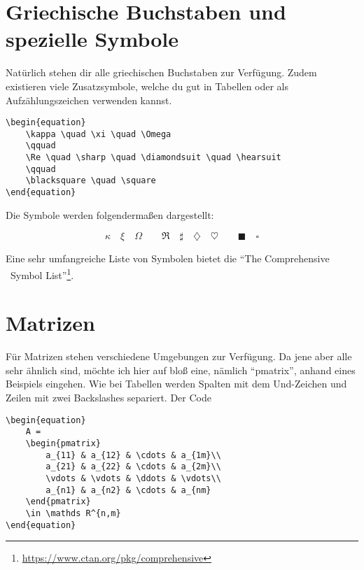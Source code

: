 \section{Griechische Buchstaben und spezielle Symbole}

Natürlich stehen dir alle griechischen Buchstaben zur Verfügung. Zudem existieren viele Zusatzsymbole, welche du gut in Tabellen oder als Aufzählungszeichen verwenden kannst.

\begin{lstlisting}
\begin{equation}
	\kappa \quad \xi \quad \Omega
	\qquad
	\Re \quad \sharp \quad \diamondsuit \quad \hearsuit
	\qquad
	\blacksquare \quad \square 
\end{equation}
\end{lstlisting} 

Die Symbole werden folgendermaßen dargestellt:

\begin{equation}
	\kappa \quad \xi \quad \Omega
	\qquad
	\Re \quad \sharp \quad \diamondsuit \quad \heartsuit
	\qquad
	\blacksquare \quad \square 
\end{equation}

Eine sehr umfangreiche Liste von Symbolen bietet die \enquote{The Comprehensive \DMLLaTeX \ Symbol List}\footnote{\href{https://www.ctan.org/pkg/comprehensive}{https://www.ctan.org/pkg/comprehensive}}.

\section{Matrizen}
Für Matrizen stehen verschiedene Umgebungen zur Verfügung. Da jene aber alle sehr ähnlich sind, möchte ich hier auf bloß eine, nämlich \enquote{pmatrix}, anhand eines Beispiels eingehen. Wie bei Tabellen werden Spalten mit dem Und-Zeichen und Zeilen mit zwei Backslashes separiert.
Der Code
\begin{lstlisting}
\begin{equation}
	A =
	\begin{pmatrix}
		a_{11} & a_{12} & \cdots & a_{1m}\\
		a_{21} & a_{22} & \cdots & a_{2m}\\
		\vdots & \vdots & \ddots & \vdots\\
		a_{n1} & a_{n2} & \cdots & a_{nm}
	\end{pmatrix}
	\in \mathds R^{n,m}
\end{equation}
\end{lstlisting} 

